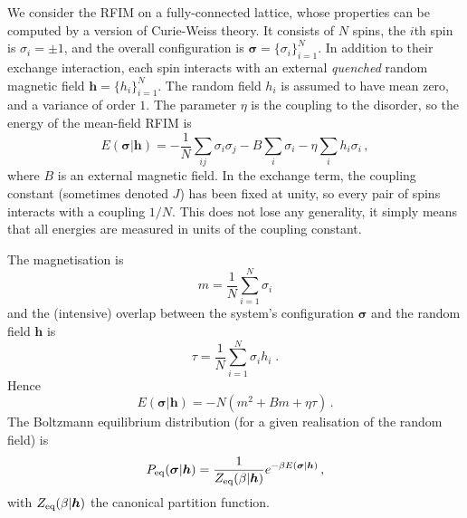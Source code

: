 \documentclass{iopart}
\begin{document}
We consider the RFIM on a fully-connected lattice, whose properties can be computed by a version of Curie-Weiss theory.  
It consists of $N$ spins, the %
$i$th spin is $\sigma_{i}=\pm 1$, and the overall configuration is $\bm{\sigma} = {\{ \sigma_{i} \}}_{i=1}^{N}$.  
In addition to their exchange interaction, each spin interacts with an external \emph{quenched} random magnetic field $\bm{h}={\{ h_{i} \}}_{i=1}^{N}$. 
The random field $h_{i}$ is assumed to have mean zero, and a variance of order $1$. The parameter $\eta$ is the coupling to the disorder, so
the energy of the mean-field RFIM is 
\begin{equation}
  \label{eq:1a}
  E(\bm{\sigma}|\bm{h}) = -  \frac{1}{N} \sum_{ij} \sigma_i \sigma_j  - B \sum_i \sigma_i - \eta \sum_i h_i \sigma_i  \, ,
\end{equation}
where $B$ is an external magnetic field.  In the exchange term, the coupling constant (sometimes denoted $J$) has been fixed at unity, so every pair of spins interacts with a coupling $1/N$.   This does not lose any generality, it simply means that all energies are measured in units of the coupling constant.

The magnetisation is
\begin{equation}
  \label{eq:4}
  m = \frac{1}{N} \sum_{i=1}^{N} \sigma_{i}
\end{equation}
and the (intensive) overlap between the system's configuration $\bm{\sigma}$ and the random field $\bm{h}$ is
 \begin{equation}
  \label{eq:5}
  \tau = \frac{1}{N} \sum_{i=1}^{N} \sigma_{i} h_{i}  \; .
\end{equation}
Hence
\begin{equation}
  \label{eq:1b}
  E(\bm{\sigma}|\bm{h}) = - N \left( m^{2} + B m + \eta \tau \right) \, .
\end{equation}
The Boltzmann equilibrium distribution (for a given realisation of the random field) is
\begin{equation}
  \label{eq:6}
  P_{\rm eq}(\bm{\sigma}|\bm{h}) = \frac{1}{Z_{\rm eq}(\beta | \bm{h})} e^{-\beta E(\bm{\sigma}|\bm{h})} \, ,
\end{equation}
with $Z_{\rm eq}(\beta | \bm{h})$ the canonical partition function. %
\end{document}
